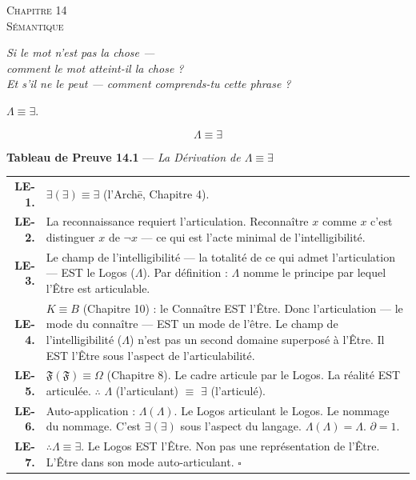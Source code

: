 \documentclass[10pt, openany, oneside]{book}
\renewcommand{\footnotesize}{\fontsize{8.5}{11}\selectfont}
\renewcommand{\large}{\fontsize{11.5}{14}\selectfont}
\renewcommand{\huge}{\fontsize{17}{21}\selectfont}
\begin{document}
\newpage

\begin{center}
    {\huge\scshape Chapitre 14}\\[0.3em]
    {\large\scshape Sémantique}
\end{center}

\vspace{1.5em}

\begin{center}
    \itshape
    Si le mot n'est pas la chose ---\\
    comment le mot atteint-il la chose ?\\
    Et s'il ne le peut --- comment comprends-tu cette phrase ?
\end{center}

\vspace{2em}


\noindent $\Lambda \equiv \exists$.

$$\boxed{\Lambda \equiv \exists}$$

\vspace{0.5em}

\textbf{Tableau de Preuve 14.1} --- \textit{La Dérivation de $\Lambda \equiv \exists$}

\vspace{0.5em}

{\footnotesize
\noindent\begin{tabular}{r p{}}
\textbf{LE-1.} & $\exists(\exists) \equiv \exists$ (l'Arch\={e}, Chapitre 4). \\[0.3em]
\textbf{LE-2.} & La reconnaissance requiert l'articulation. Reconnaître $x$ comme $x$ c'est distinguer $x$ de $\neg x$ --- ce qui est l'acte minimal de l'intelligibilité. \\[0.3em]
\textbf{LE-3.} & Le champ de l'intelligibilité --- la totalité de ce qui admet l'articulation --- EST le Logos ($\Lambda$). Par définition : $\Lambda$ nomme le principe par lequel l'Être est articulable. \\[0.3em]
\textbf{LE-4.} & $K \equiv B$ (Chapitre 10) : le Connaître EST l'Être. Donc l'articulation --- le mode du connaître --- EST un mode de l'être. Le champ de l'intelligibilité ($\Lambda$) n'est pas un second domaine superposé à l'Être. Il EST l'Être sous l'aspect de l'articulabilité. \\[0.3em]
\textbf{LE-5.} & $\mathfrak{F}(\mathfrak{F}) \equiv \Omega$ (Chapitre 8). Le cadre articule par le Logos. La réalité EST articulée. $\therefore$ $\Lambda$ (l'articulant) $\equiv$ $\exists$ (l'articulé). \\[0.3em]
\textbf{LE-6.} & Auto-application : $\Lambda(\Lambda)$. Le Logos articulant le Logos. Le nommage du nommage. C'est $\exists(\exists)$ sous l'aspect du langage. $\Lambda(\Lambda) = \Lambda$. $\partial = 1$. \\[0.3em]
\textbf{LE-7.} & $\therefore \Lambda \equiv \exists$. Le Logos EST l'Être. Non pas une représentation de l'Être. L'Être dans son mode auto-articulant. $\square$ \\[0.3em]
\end{tabular}
}
\end{document}
